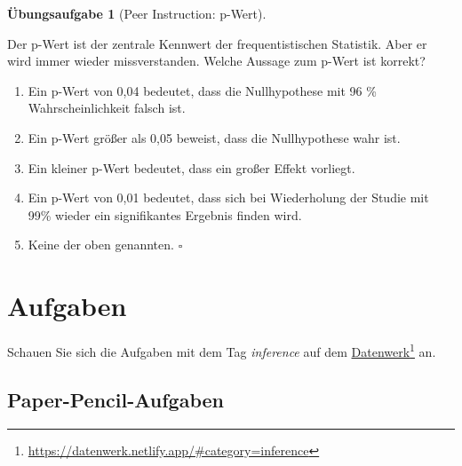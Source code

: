 \documentclass[
  ngerman,
  letterpaper,
  twoside,
  open=any]{scrbook}
\providecommand{\tightlist}{%
  \setlength{\itemsep}{0pt}\setlength{\parskip}{0pt}}\usepackage{longtable,booktabs,array}
\theoremstyle{definition}
\theoremstyle{plain}
\theoremstyle{definition}
\newtheorem{exercise}{Übungsaufgabe}[chapter]
\theoremstyle{definition}
\theoremstyle{remark}
\begin{document}
\begin{exercise}[Peer Instruction:
p-Wert]\protect\hypertarget{exr-pwert}{}\label{exr-pwert}

Der p-Wert ist der zentrale Kennwert der frequentistischen Statistik.
Aber er wird immer wieder missverstanden. Welche Aussage zum p-Wert ist
korrekt?

\begin{enumerate}
\def\labelenumi{\Alph{enumi})}
\tightlist
\item
  Ein p-Wert von 0,04 bedeutet, dass die Nullhypothese mit 96 \%
  Wahrscheinlichkeit falsch ist.
\item
  Ein p-Wert größer als 0,05 beweist, dass die Nullhypothese wahr ist.
\item
  Ein kleiner p-Wert bedeutet, dass ein großer Effekt vorliegt.
\item
  Ein p-Wert von 0,01 bedeutet, dass sich bei Wiederholung der Studie
  mit 99\% wieder ein signifikantes Ergebnis finden wird.
\item
  Keine der oben genannten. \(\square\)
\end{enumerate}

\end{exercise}

\section{Aufgaben}\label{aufgaben-1}

Schauen Sie sich die Aufgaben mit dem Tag \emph{inference} auf dem
\href{https://datenwerk.netlify.app/\#category=inference}{Datenwerk}\footnote{\url{https://datenwerk.netlify.app/\#category=inference}}
an.

\subsection{Paper-Pencil-Aufgaben}\label{paper-pencil-aufgaben}
\end{document}
